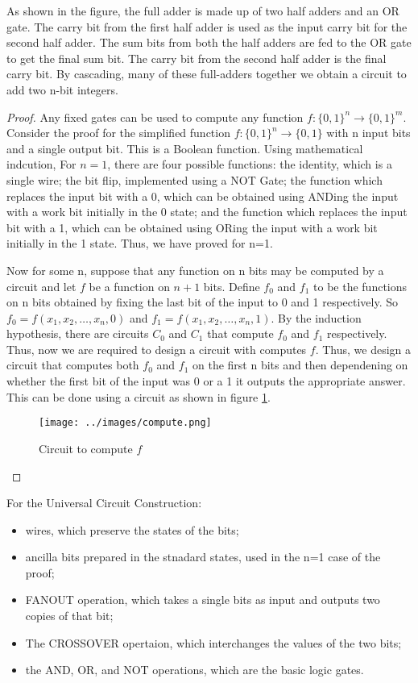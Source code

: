 \documentclass[12pt, oneside]{book}
\theoremstyle{definition}
\theoremstyle{definition}
\theoremstyle{remark}
\begin{document}
As shown in the figure, the full adder is made up of two half adders and an OR gate. The carry bit from the first half adder is used as the input carry bit for the second half adder. The sum bits from both the half adders are fed to the OR gate to get the final sum bit. The carry bit from the second half adder is the final carry bit.
By cascading, many of these full-adders together we obtain a circuit to add two n-bit integers.

\label{proof:classicalcomputations}
\begin{proof}
    Any fixed gates can be used to compute any function $f:\{0,1\}^n \rightarrow \{0,1\}^m$.
    Consider the proof for the simplified function $f:\{0,1\}^n \rightarrow \{0,1\}$ with n input bits
    and a single output bit. This is a Boolean function. Using mathematical indcution, For $n=1$, there are four possible functions: the identity, which is 
    a single wire; the bit flip, implemented using a NOT Gate; the function which replaces the input bit with a 0, which can be obtained using ANDing the input 
    with a work bit initially in the 0 state; and the function which replaces the input bit with a 1, which can be obtained using ORing the input with a work bit initially in the 1 state.
    Thus, we have proved for n=1.
    
    Now for some n, suppose that any function on n bits may be computed by a circuit and let $f$ be a function on $n+1$ bits. 
    Define $f_0$ and $f_1$ to be the functions on n bits obtained by fixing the last bit of the input to 0 and 1 respectively.
    So $f_0=f(x_1,x_2,\ldots,x_n,0)$ and $f_1=f(x_1,x_2,\ldots,x_n,1)$.
    By the induction hypothesis, there are circuits $C_0$ and $C_1$ that compute $f_0$ and $f_1$ respectively.
    Thus, now we are required to design a circuit with computes $f$. Thus, we design a circuit that computes both $f_0$ and $f_1$ 
    on the first n bits and then dependening on whether the first bit of the input was 0 or a 1 it outputs the appropriate answer.
    This can be done using a circuit as shown in figure \ref{fig:compute}.
    \begin{figure}[H]
        \centering
        \texttt{[image: ../images/compute.png]}
        \caption{Circuit to compute $f$}
        \label{fig:compute}
    \end{figure}
\end{proof}
For the Universal Circuit Construction:
\begin{itemize}
    \item wires, which preserve the states of the bits;
    \item ancilla bits prepared in the stnadard states, used in the n=1 case of the proof;
    \item FANOUT operation, which takes a single bits as input and outputs two copies of that bit;
    \item The CROSSOVER opertaion, which interchanges the values of the two bits;
    \item the AND, OR, and NOT operations, which are the basic logic gates.
\end{itemize}
\end{document}

